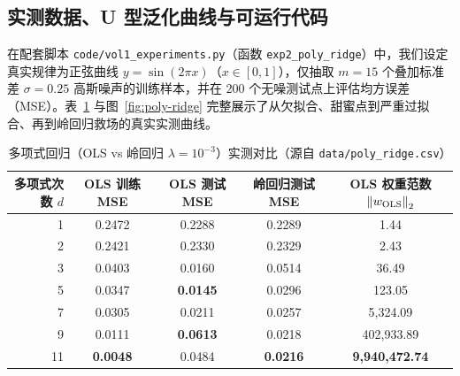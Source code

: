 \subsection{实测数据、U 型泛化曲线与可运行代码}

在配套脚本 \texttt{code/vol1\_experiments.py}（函数 \texttt{exp2\_poly\_ridge}）中，我们设定真实规律为正弦曲线 $y = \sin(2\pi x)$（$x \in [0, 1]$），仅抽取 $m = 15$ 个叠加标准差 $\sigma = 0.25$ 高斯噪声的训练样本，并在 $200$ 个无噪测试点上评估均方误差（MSE）。表~\ref{tab:poly-ridge} 与图~\ref{fig:poly-ridge} 完整展示了从欠拟合、甜蜜点到严重过拟合、再到岭回归救场的真实实测曲线。

\begin{table}[htbp]
\centering
\caption{多项式回归（OLS vs 岭回归 $\lambda = 10^{-3}$）实测对比（源自 \texttt{data/poly\_ridge.csv}）}\label{tab:poly-ridge}
{\small
\begin{tabular}{@{}rcccc@{}}
\toprule
\textbf{多项式次数 $d$} & \textbf{OLS 训练 MSE} & \textbf{OLS 测试 MSE} & \textbf{岭回归测试 MSE} & \textbf{OLS 权重范数 $\left\|w_{\text{OLS}}\right\|_2$} \\
\midrule
1 & 0.2472 & 0.2288 & 0.2289 & 1.44 \\
2 & 0.2421 & 0.2330 & 0.2329 & 2.43 \\
3 & 0.0403 & 0.0160 & 0.0514 & 36.49 \\
5 & 0.0347 & \textbf{0.0145} & 0.0296 & 123.05 \\
7 & 0.0305 & 0.0211 & 0.0257 & 5,324.09 \\
9 & 0.0111 & \textcolor{ochre}{\textbf{0.0613}} & 0.0218 & 402,933.89 \\
11 & \textbf{0.0048} & \textcolor{ochre}{0.0484} & \textbf{0.0216} & \textcolor{ochre}{\textbf{9,940,472.74}} \\
\bottomrule
\end{tabular}}
\end{table}

